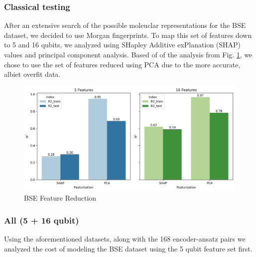 \documentclass[journal=jacsat,manuscript=article]{achemso}
\begin{document}
\subsubsection{Classical testing}
After an extensive search of the possible moleuclar representations for the BSE dataset, we decided to use Morgan fingerprints.
To map this set of features down to 5 and 16 qubits, we analyzed using SHapley Additive exPlanation (SHAP) values and principal component analysis.
Based of of the analysis from Fig. \ref{fig:Feat_redR2}, we chose to use the set of features reduced using PCA due to the more accurate, albiet overfit data.
\begin{figure}[H]
	\centering
	\includegraphics[width=\textwidth]{images/BSE/Feat_redR2.png}
	\caption{BSE Feature Reduction}
	\label{fig:Feat_redR2}
\end{figure}
\subsubsection{All (5 + 16 qubit)}
Using the aforementioned datasets, along with the 168 encoder-ansatz pairs we analyzed the cost of modeling the BSE dataset using the 5 qubit feature set first.
\end{document}
